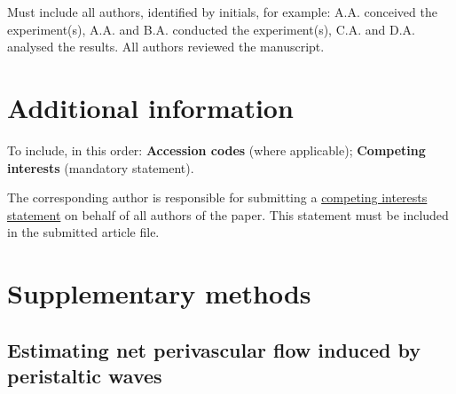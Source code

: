 \documentclass[fleqn,10pt]{wlscirep}
\begin{document}
Must include all authors, identified by initials, for example:
A.A. conceived the experiment(s),  A.A. and B.A. conducted the experiment(s), C.A. and D.A. analysed the results.  All authors reviewed the manuscript. 

\section*{Additional information}

To include, in this order: \textbf{Accession codes} (where applicable); \textbf{Competing interests} (mandatory statement). 

The corresponding author is responsible for submitting a \href{http://www.nature.com/srep/policies/index.html#competing}{competing interests statement} on behalf of all authors of the paper. This statement must be included in the submitted article file.


\newpage
\appendix

\section{Supplementary methods}

\subsection{Estimating net perivascular flow induced by peristaltic waves}
\label{sec:sup:peristalsis}
\end{document}
